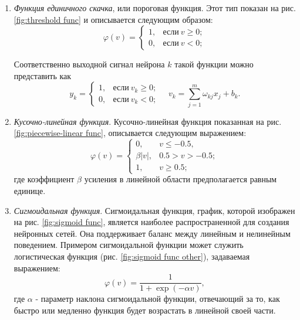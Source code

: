 \documentclass[a4paper,12pt]{report}
\begin{document}
\begin{enumerate}
    \item \textit{Функция единичного скачка}, или пороговая функция.
        Этот тип показан на рис. \ref{fig:threshold func} и описывается следующим образом:
        \begin{equation}
            \varphi(v) =
            \begin{cases}
                1,& \text{если}\ v \geq 0; \\
                0,& \text{если}\ v < 0;
            \end{cases}
        \end{equation}

    Соответственно выходной сигнал нейрона $k$ такой функции можно
    представить как
        \begin{equation}
                y_k =
                \begin{cases}
                    1,& \text{если}\ v_k \geq 0; \\
                    0,& \text{если}\ v_k < 0;
                \end{cases}\quad
                v_k = \sum^{m}_{j=1}{\omega_{kj}x_j + b_k.}
        \end{equation}

    \item \textit{Кусочно-линейная функция}. Кусочно-линейная функция
        показанная на рис. \ref{fig:piecewise-linear func},
        описывается следующим выражением:
        \begin{equation}
            \varphi(v) =
                \begin{cases}
                    0    ,& v \leq -0.5, \\
                    \beta|v| ,& 0.5 > v > -0.5; \\
                    1    ,& v \geq 0.5;
                \end{cases}
        \end{equation}
        где коэффициент $\beta$ усиления в линейной области предполагается
        равным единице.

    \item \textit{Сигмоидальная функция}. Сигмоидальная функция,
        график, которой изображен на рис. \ref{fig:sigmoid func},
        является наиболее распространенной для создания нейронных
        сетей. Она поддерживает баланс между линейным и нелинейным
        поведением. Примером сигмоидальной функции может служить
        логистическая функция (рис. \ref{fig:sigmoid func other}), задаваемая выражением:
        \begin{equation}
        \varphi(v) = \frac{1}{1+\exp(-\alpha v)},
        \end{equation}
        где $\alpha$ - параметр наклона сигмоидальной функции,
        отвечающий за то, как быстро или медленно функция будет
        возрастать в линейной своей части.

\end{enumerate}
\end{document}
